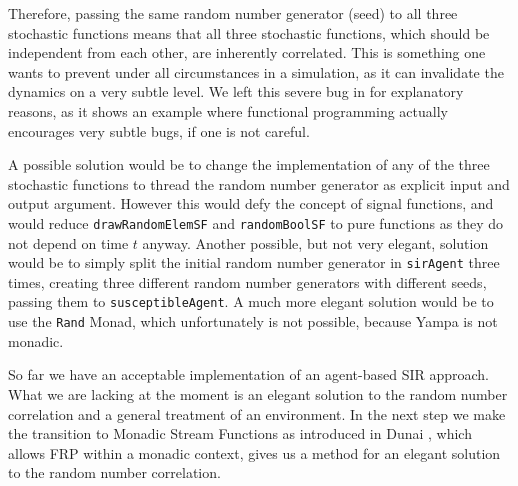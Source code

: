 Therefore, passing the same random number generator (seed) to all three stochastic functions means that all three stochastic functions, which should be independent from each other, are inherently correlated. This is something one wants to prevent under all circumstances in a simulation, as it can invalidate the dynamics on a very subtle level. We left this severe bug in for explanatory reasons, as it shows an example where functional programming actually encourages very subtle bugs, if one is not careful.

A possible solution would be to change the implementation of any of the three stochastic functions to thread the random number generator as explicit input and output argument. However this would defy the concept of signal functions, and would reduce \texttt{drawRandomElemSF} and \texttt{randomBoolSF} to pure functions as they do not depend on time $t$ anyway. Another possible, but not very elegant, solution would be to simply split the initial random number generator in \texttt{sirAgent} three times, creating three different random number generators with different seeds, passing them to \texttt{susceptibleAgent}. A much more elegant solution would be to use the \texttt{Rand} Monad, which unfortunately is not possible, because Yampa is not monadic. 

So far we have an acceptable implementation of an agent-based SIR approach. What we are lacking at the moment is an elegant solution to the random number correlation and a general treatment of an environment. In the next step we make the transition to Monadic Stream Functions as introduced in Dunai \cite{perez_functional_2016}, which allows FRP within a monadic context, gives us a method for an elegant solution to the random number correlation.